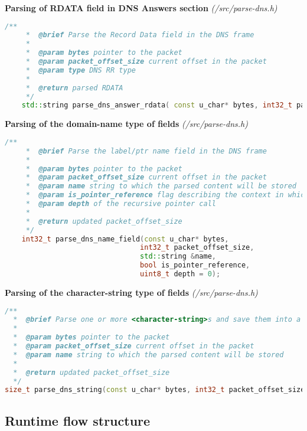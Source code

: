 \pagebreak

\vspace{1cm}
\textbf{Parsing of RDATA field in DNS Answers section} \textit{(/src/parse-dns.h)}
\begin{lstlisting}[language=C++] 
    /**
     *  @brief Parse the Record Data field in the DNS frame 
     * 
     *  @param bytes pointer to the packet
     *  @param packet_offset_size current offset in the packet
     *  @param type DNS RR type 
     *  
     *  @return parsed RDATA
     */
    std::string parse_dns_answer_rdata( const u_char* bytes, int32_t packet_offset_size, uint16_t rdata_length, uint16_t type);
\end{lstlisting}



\vspace{1cm}
\textbf{Parsing of the domain-name type of fields} \textit{(/src/parse-dns.h)}
\begin{lstlisting}[language=C++]
    /**
     *  @brief Parse the label/ptr name field in the DNS frame
     * 
     *  @param bytes pointer to the packet
     *  @param packet_offset_size current offset in the packet
     *  @param name string to which the parsed content will be stored
     *  @param is_pointer_reference flag describing the context in which the name parsing is run
     *  @param depth of the recursive pointer call
     * 
     *  @return updated packet_offset_size
     */
    int32_t parse_dns_name_field(const u_char* bytes, 
                                int32_t packet_offset_size, 
                                std::string &name, 
                                bool is_pointer_reference,
                                uint8_t depth = 0);
\end{lstlisting}

\vspace{1cm}
\textbf{Parsing of the character-string type of fields} \textit{(/src/parse-dns.h)}
\begin{lstlisting}[language=C++]
/**
  *  @brief Parse one or more <character-string>s and save them into a string
  *
  *  @param bytes pointer to the packet
  *  @param packet_offset_size current offset in the packet
  *  @param name string to which the parsed content will be stored
  * 
  *  @return updated packet_offset_size
  */
size_t parse_dns_string(const u_char* bytes, int32_t packet_offset_size, std::string &name);
\end{lstlisting}

\pagebreak

\subsection{Runtime flow structure}

